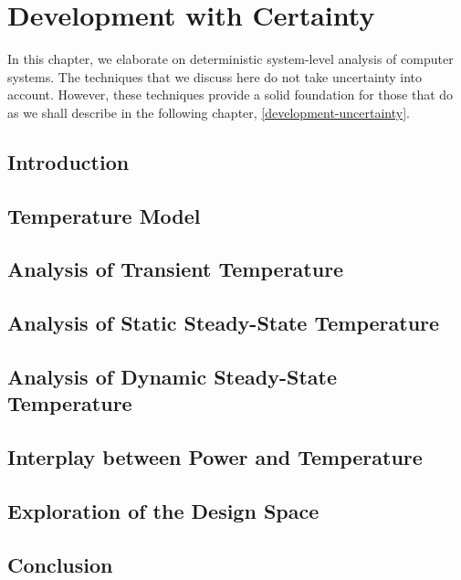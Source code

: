 \chapter{Development with Certainty}
\newcommand{\inputsection}[1]{}

In this chapter, we elaborate on deterministic system-level analysis of computer
systems. The techniques that we discuss here do not take uncertainty into
account. However, these techniques provide a solid foundation for those that do
as we shall describe in the following chapter, \cref{development-uncertainty}.

\section{Introduction}
\inputsection{introduction}

\section{Temperature Model}
\inputsection{temperature-model}

\section{Analysis of Transient Temperature}
\inputsection{transient-analysis}

\section{Analysis of Static Steady-State Temperature}
\inputsection{static-steady-state-analysis}

\section{Analysis of Dynamic Steady-State Temperature}
\inputsection{dynamic-steady-state-analysis}

\section{Interplay between Power and Temperature}
\inputsection{power-temperature-interplay}

\section{Exploration of the Design Space}
\inputsection{design-space-exploration}

\section{Conclusion}
\inputsection{conclusion}
